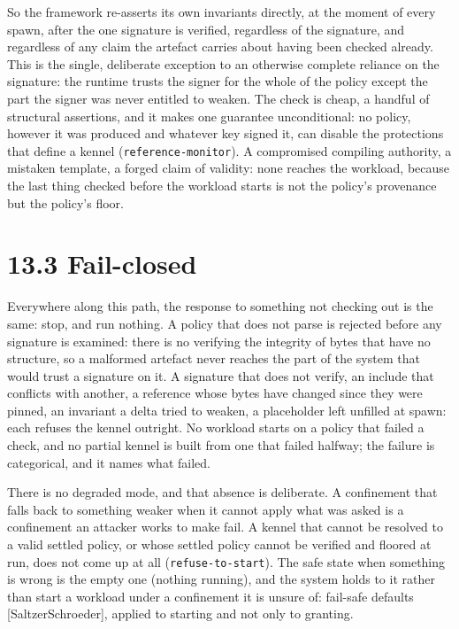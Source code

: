 So the framework re-asserts its own invariants directly, at the moment
of every spawn, after the one signature is verified, regardless of the
signature, and regardless of any claim the artefact carries about having
been checked already. This is the single, deliberate exception to an
otherwise complete reliance on the signature: the runtime trusts the
signer for the whole of the policy except the part the signer was never
entitled to weaken. The check is cheap, a handful of structural
assertions, and it makes one guarantee unconditional: no policy, however
it was produced and whatever key signed it, can disable the protections
that define a kennel (\texttt{reference-monitor}). A compromised
compiling authority, a mistaken template, a forged claim of validity:
none reaches the workload, because the last thing checked before the
workload starts is not the policy's provenance but the policy's floor.

\hypertarget{fail-closed}{%
\section{13.3 Fail-closed}\label{fail-closed}}

Everywhere along this path, the response to something not checking out
is the same: stop, and run nothing. A policy that does not parse is
rejected before any signature is examined: there is no verifying the
integrity of bytes that have no structure, so a malformed artefact never
reaches the part of the system that would trust a signature on it. A
signature that does not verify, an include that conflicts with another,
a reference whose bytes have changed since they were pinned, an
invariant a delta tried to weaken, a placeholder left unfilled at spawn:
each refuses the kennel outright. No workload starts on a policy that
failed a check, and no partial kennel is built from one that failed
halfway; the failure is categorical, and it names what failed.

There is no degraded mode, and that absence is deliberate. A confinement
that falls back to something weaker when it cannot apply what was asked
is a confinement an attacker works to make fail. A kennel that cannot be
resolved to a valid settled policy, or whose settled policy cannot be
verified and floored at run, does not come up at all
(\texttt{refuse-to-start}). The safe state when something is wrong is
the empty one (nothing running), and the system holds to it rather than
start a workload under a confinement it is unsure of: fail-safe defaults
{[}SaltzerSchroeder{]}, applied to starting and not only to granting.

